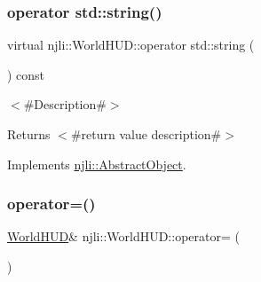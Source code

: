 \mbox{\label{classnjli_1_1_world_h_u_d_a0125b46badab61261aa8240b0255d171}} 
\subsubsection{\texorpdfstring{operator std\+::string()}{operator std::string()}}
{\footnotesize\ttfamily virtual njli\+::\+World\+H\+U\+D\+::operator std\+::string (\begin{DoxyParamCaption}{ }\end{DoxyParamCaption}) const\hspace{0.3cm}{\ttfamily [virtual]}}

$<$\#\+Description\#$>$

\begin{DoxyReturn}{Returns}
$<$\#return value description\#$>$ 
\end{DoxyReturn}


Implements \mbox{\hyperlink{classnjli_1_1_abstract_object_afc07f4138bd3003910e7aa7fa0fe11ad}{njli\+::\+Abstract\+Object}}.

\mbox{\label{classnjli_1_1_world_h_u_d_a231ab1b0c3b57e374b906f55d4b5f5b7}} 
\subsubsection{\texorpdfstring{operator=()}{operator=()}}
{\footnotesize\ttfamily \mbox{\hyperlink{classnjli_1_1_world_h_u_d}{World\+H\+UD}}\& njli\+::\+World\+H\+U\+D\+::operator= (\begin{DoxyParamCaption}\item[{const \mbox{\hyperlink{classnjli_1_1_world_h_u_d}{World\+H\+UD}} \&}]{ }\end{DoxyParamCaption})\hspace{0.3cm}{\ttfamily [private]}}

\mbox{\label{classnjli_1_1_world_h_u_d_ab8e986fe57556113de8902cd91e58725}} 
